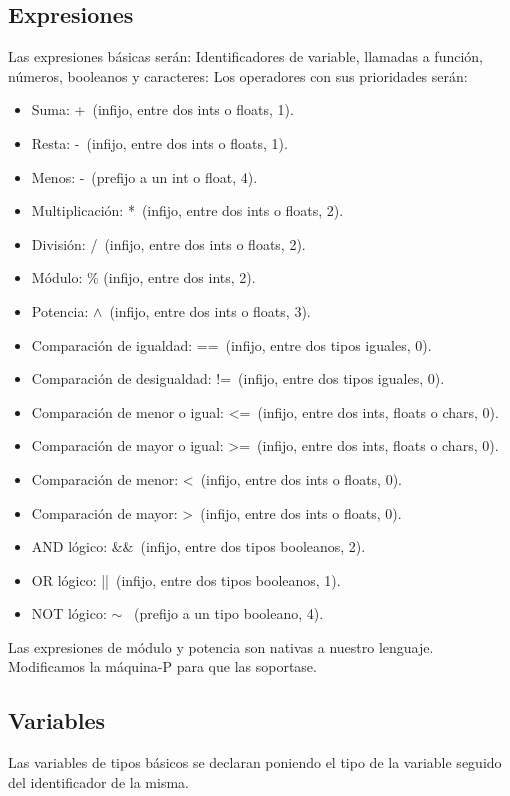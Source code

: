 \documentclass[a4paper, 12pt]{article}
\begin{document}
\subsection{Expresiones}
Las expresiones básicas serán: Identificadores de variable, llamadas a función, números, booleanos y caracteres: Los operadores con sus prioridades serán:
	\begin{itemize}
	\item Suma: +\ (infijo, entre dos ints o floats, 1).
	\item Resta: -\ (infijo, entre dos ints o floats, 1).
	\item Menos: -\ (prefijo a un int o float, 4).
	\item Multiplicación: *\ (infijo, entre dos ints o floats, 2).
	\item División: /\ (infijo, entre dos ints o floats, 2).
	\item Módulo: \% (infijo, entre dos ints, 2).
	\item Potencia: $\wedge$\ (infijo, entre dos ints o floats, 3).
	\item Comparación de igualdad: ==\ (infijo, entre dos tipos iguales, 0).
	\item Comparación de desigualdad: !=\ (infijo, entre dos tipos iguales, 0).
	\item Comparación de menor o igual: <=\ (infijo, entre dos ints, floats o chars, 0).
	\item Comparación de mayor o igual: >=\ (infijo, entre dos ints, floats o chars, 0).
	\item Comparación de menor: <\ (infijo, entre dos ints o floats, 0).
	\item Comparación de mayor: >\ (infijo, entre dos ints o floats, 0).
	\item AND lógico: \&\&\ (infijo, entre dos tipos booleanos, 2).
	\item OR lógico: ||\ (infijo, entre dos tipos booleanos, 1).
	\item NOT lógico: $\sim$ \ (prefijo a un tipo  booleano, 4).
	\end{itemize}
	
	Las expresiones de módulo y potencia son nativas a nuestro lenguaje. Modificamos la máquina-P para que las soportase.

\subsection{Variables}
Las variables de tipos básicos se declaran poniendo el tipo de la variable seguido del identificador de la misma.\\
\end{document}
